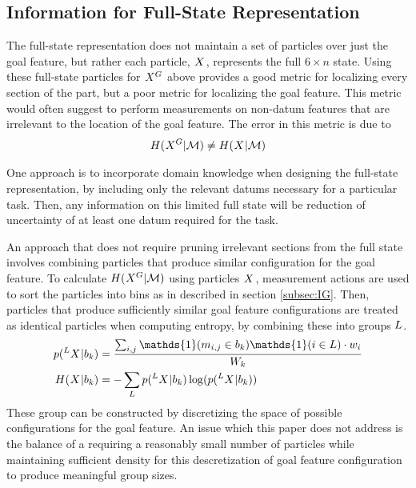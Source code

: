 \documentclass[../thesis.tex]{subfiles}
\begin{document}
\subsection{Information for Full-State Representation}
The full-state representation does not maintain a set of particles over just the goal feature, but rather each particle, $\particles$, represents the full $6 \times n$ state.
Using these full-state particles for $\particles[][][G]$ above provides a good metric for localizing every section of the part, but a poor metric for localizing the goal feature.
This metric would often suggest to perform measurements on non-datum features that are irrelevant to the location of the goal feature.
The error in this metric is due to
\begin{align}
  H(\particles[][][G]|\maction) \neq H(\particles|\maction)
\end{align}

One approach is to incorporate domain knowledge when designing the full-state representation, by including only the relevant datums necessary for a particular task. 
Then, any information on this limited full state will be reduction of uncertainty of at least one datum required for the task.

An approach that does not require pruning irrelevant sections from the full state involves combining particles that produce similar configuration for the goal feature. 
To calculate $H(\particles[][][G]|\maction)$ using particles $\particles$, measurement actions are used to sort the particles into bins as in described in section \ref{subsec:IG}.
Then, particles that produce sufficiently similar goal feature configurations are treated as identical particles when computing entropy, by combining these into groups $L$.
\begin{align}
  p(\particles[][L]|\bin_k) &= 
  \frac{\sum_{i,j} \mathds{1}(\measurement_{i,j} \in \bin_k) \mathds{1}(i \in L) \cdot w_i}{W_k}\\
  H(\particles | \bin_k) &= -\sum_L p(\particles[][L]|\bin_k) \log(p(\particles[][L]|\bin_k))  
\end{align}
These group can be constructed by discretizing the space of possible configurations for the goal feature.
An issue which this paper does not address is the balance of a requiring a reasonably small number of particles while maintaining sufficient density for this descretization of goal feature configuration to produce meaningful group sizes.
\end{document}
